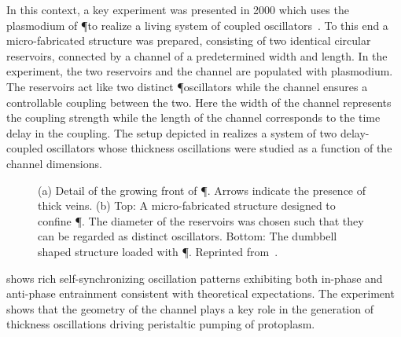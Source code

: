 			In this context, a key experiment was presented in 2000 which uses the plasmodium of \P to realize a living system of coupled oscillators~\cite{PhysRevLett.85.2026}. To this end a micro-fabricated structure was prepared, consisting of two identical circular reservoirs, connected by a channel of a predetermined width and length. In the experiment, the two reservoirs and the channel are populated with plasmodium. The reservoirs act like two distinct \P oscillators while the channel ensures a controllable coupling between the two. Here the width of the channel represents the coupling strength while the length of the channel corresponds to the time delay in the coupling. The setup depicted in  realizes a system of two delay-coupled oscillators whose thickness oscillations were studied as a function of the channel dimensions.

			\begin{figure}[htb]
				\centering
	
				\caption[Oscillator experiment - Setup]{(a) Detail of the growing front of \P. Arrows indicate the presence of thick veins. (b) Top: A micro-fabricated structure designed to confine \P. The diameter of the reservoirs was chosen such that they can be regarded as distinct oscillators. Bottom: The dumbbell shaped structure loaded with \P. Reprinted from~\cite{PhysRevLett.85.2026}.}
				\label{fig:oscillator_experiment_setup}
			\end{figure}

			 shows rich self-synchronizing oscillation patterns exhibiting both in-phase and anti-phase entrainment consistent with theoretical expectations. The experiment shows that the geometry of the channel plays a key role in the generation of thickness oscillations driving peristaltic pumping of protoplasm.


